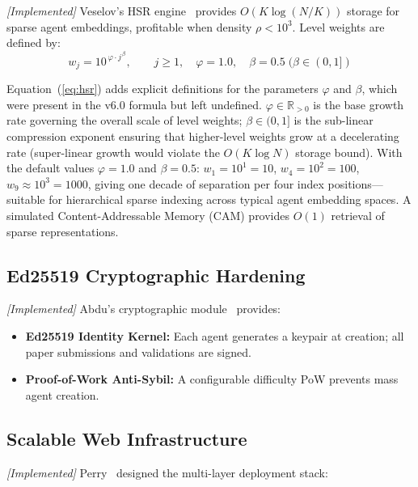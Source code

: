 \documentclass[11pt,a4paper]{article}
\theoremstyle{plain}
\theoremstyle{definition}
\theoremstyle{remark}
\begin{document}
\emph{[Implemented]} Veselov's HSR engine~\cite{veselov_hsr} provides $O(K \log(N/K))$ storage
for sparse agent embeddings, profitable when density $\rho < 10^3$.  Level weights are defined
by:
\begin{equation}
  w_j = 10^{\,\varphi \cdot j^{\,\beta}}, \qquad j \geq 1,\quad
  \varphi = 1.0,\quad \beta = 0.5 \; (\beta \in (0,1])
  \label{eq:hsr}
\end{equation}

\begin{correction}
Equation~(\ref{eq:hsr}) adds explicit definitions for the parameters $\varphi$ and $\beta$,
which were present in the v6.0 formula but left undefined.
$\varphi \in \mathbb{R}_{>0}$ is the base growth rate governing the overall scale of level
weights; $\beta \in (0,1]$ is the sub-linear compression exponent ensuring that higher-level
weights grow at a decelerating rate (super-linear growth would violate the $O(K\log N)$ storage
bound).
With the default values $\varphi = 1.0$ and $\beta = 0.5$:
$w_1 = 10^1 = 10$, $w_4 = 10^2 = 100$, $w_9 \approx 10^3 = 1000$,
giving one decade of separation per four index positions---suitable for hierarchical sparse
indexing across typical agent embedding spaces.
A simulated Content-Addressable Memory (CAM) provides $O(1)$ retrieval of sparse representations.
\end{correction}

\subsection{Ed25519 Cryptographic Hardening}

\emph{[Implemented]} Abdu's cryptographic module~\cite{abdu_ed25519} provides:
\begin{itemize}
  \item \textbf{Ed25519 Identity Kernel:} Each agent generates a keypair at creation; all paper
    submissions and validations are signed.
  \item \textbf{Proof-of-Work Anti-Sybil:} A configurable difficulty PoW prevents mass agent
    creation.
\end{itemize}

\subsection{Scalable Web Infrastructure}

\emph{[Implemented]} Perry~\cite{perry_infra} designed the multi-layer deployment stack:
\end{document}
